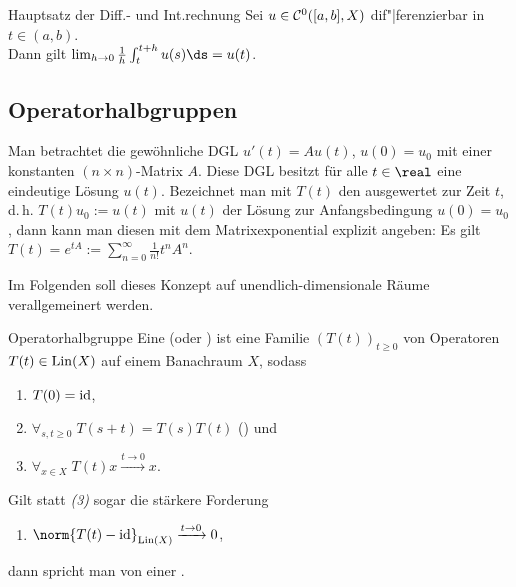 \begin{Satz}{Hauptsatz der Diff.- und Int.rechnung}
    Sei $u \in \mathcal{C}^0([a, b], X)$ dif"|ferenzierbar in $t \in (a, b)$.\\
    Dann gilt $\lim_{h \to 0} \frac{1}{h} \int_t^{t+h} u(s)\ds = u(t)$.
\end{Satz}

\subsection{%
    Operatorhalbgruppen%
}

\begin{Bem}
    Man betrachtet die gewöhnliche DGL $u'(t) = Au(t)$, $u(0) = u_0$
    mit einer konstanten $(n \times n)$-Matrix $A$.
    Diese DGL besitzt für alle $t \in \real$ eine eindeutige Lösung $u(t)$.
    Bezeichnet man mit $T(t)$ den  ausgewertet zur Zeit $t$,
    d.\,h. $T(t)u_0 := u(t)$ mit $u(t)$ der Lösung zur Anfangsbedingung $u(0) = u_0$,
    dann kann man diesen mit dem Matrixexponential explizit angeben:
    Es gilt $T(t) = e^{tA} := \sum_{n=0}^\infty \frac{1}{n!} t^n A^n$.

    Im Folgenden soll dieses Konzept auf unendlich-dimensionale Räume verallgemeinert werden.
\end{Bem}

\linie

\begin{Def}{Operatorhalbgruppe}
    Eine  (oder ) ist eine
    Familie $(T(t))_{t \ge 0}$ von Operatoren $T(t) \in \operatorname{Lin}(X)$ auf einem Banachraum $X$, sodass
    \begin{enumerate}
        \item
        $T(0) = \text{id}$,

        \item
        $\forall_{s, t \ge 0}\; T(s+t) = T(s) T(t)$
        () und

        \item
        $\forall_{x \in X}\; T(t) x \xrightarrow{t \to 0} x$.
    \end{enumerate}
    Gilt statt \emph{(3)} sogar die stärkere Forderung
    \begin{enumerate}[label=\emph{(\arabic*')},start=3]
        \item
        $\norm{T(t) - \id}_{\Lin(X)} \xrightarrow{t \to 0} 0$,
    \end{enumerate}
    dann spricht man von einer .
\end{Def}

